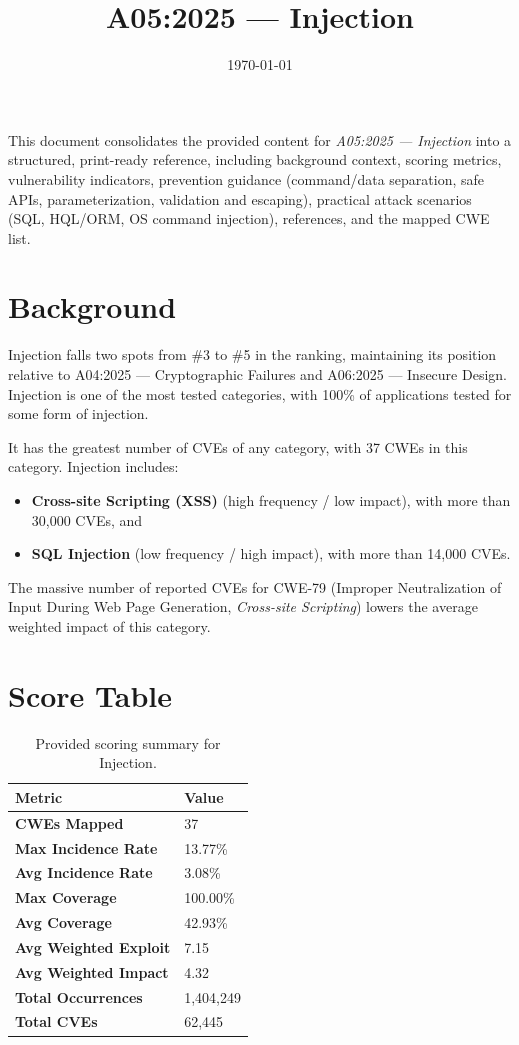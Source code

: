 \documentclass[11pt]{article}
\title{\textbf{A05:2025 — Injection}}
\date{\today}
\author{} %
\begin{document}
\maketitle

\begin{infobox}
This document consolidates the provided content for \textit{A05:2025 — Injection} into a structured, print-ready reference, including background context, scoring metrics, vulnerability indicators, prevention guidance (command/data separation, safe APIs, parameterization, validation and escaping), practical attack scenarios (SQL, HQL/ORM, OS command injection), references, and the mapped CWE list.
\end{infobox}

\tableofcontents
\newpage

\section{Background}
Injection falls two spots from \#3 to \#5 in the ranking, maintaining its position relative to A04:2025 --- Cryptographic Failures and A06:2025 --- Insecure Design. Injection is one of the most tested categories, with 100\% of applications tested for some form of injection.

It has the greatest number of CVEs of any category, with 37 CWEs in this category. Injection includes:
\begin{itemize}
  \item \textbf{Cross-site Scripting (XSS)} (high frequency / low impact), with more than 30{,}000 CVEs, and
  \item \textbf{SQL Injection} (low frequency / high impact), with more than 14{,}000 CVEs.
\end{itemize}

The massive number of reported CVEs for CWE-79 (Improper Neutralization of Input During Web Page Generation, \textit{Cross-site Scripting}) lowers the average weighted impact of this category.

\section{Score Table}
\begin{table}[h!]
\centering
\renewcommand{\arraystretch}{1.2}
\begin{tabular}{@{}>{\bfseries}p{4.9cm}p{3.1cm}@{}}
\toprule
Metric & Value \\
\midrule
CWEs Mapped & 37 \\
Max Incidence Rate & 13.77\% \\
Avg Incidence Rate & 3.08\% \\
Max Coverage & 100.00\% \\
Avg Coverage & 42.93\% \\
Avg Weighted Exploit & 7.15 \\
Avg Weighted Impact & 4.32 \\
Total Occurrences & 1{,}404{,}249 \\
Total CVEs & 62{,}445 \\
\bottomrule
\end{tabular}
\caption{Provided scoring summary for Injection.}
\end{table}
\end{document}
